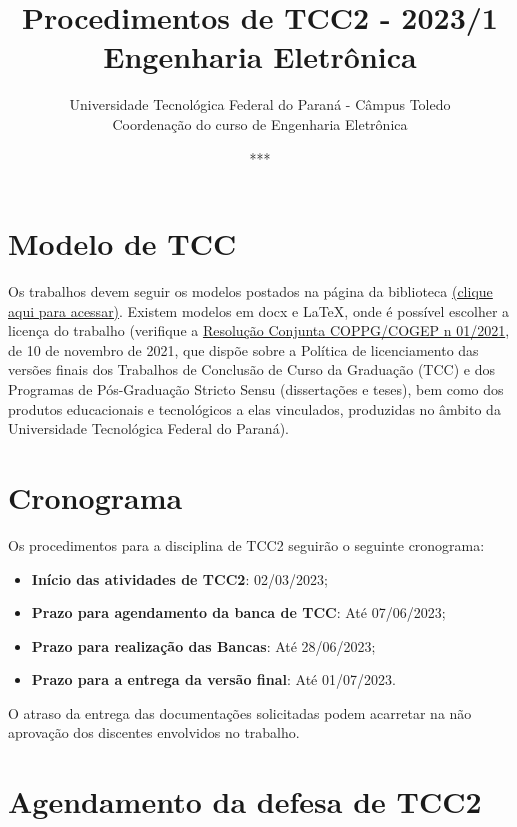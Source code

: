 \documentclass[a4paper, 12pt]{article}
\title{Procedimentos de TCC2 - 2023/1\\\textbf{Engenharia Eletrônica}}
\date{***}
\author{Universidade Tecnológica Federal do Paraná - Câmpus Toledo\\Coordenação do curso de Engenharia Eletrônica}
\newcommand{\startdate}{02/03/2023}		%
\newcommand{\agendadate}{07/06/2023}	%
\newcommand{\bancadate}{28/06/2023}		%
\newcommand{\finaldate}{01/07/2023}		%
\begin{document}
    \maketitle
    
    \section{Modelo de TCC}
    Os trabalhos devem seguir os modelos postados na página da biblioteca \href{http://portal.utfpr.edu.br/biblioteca/trabalhos-academicos}{(clique aqui para acessar)}. Existem modelos em docx e \LaTeX, onde é possível escolher a licença do trabalho (verifique a \href{https://sei.utfpr.edu.br/sei/publicacoes/controlador_publicacoes.php?acao=publicacao_visualizar&id_documento=2615190&id_orgao_publicacao=0}{Resolução Conjunta COPPG/COGEP n\textordmasculine{} 01/2021}, de 10 de novembro de 2021, que dispõe sobre a Política de licenciamento das versões finais dos Trabalhos de Conclusão de Curso da Graduação (TCC) e dos Programas de Pós-Graduação Stricto Sensu (dissertações e teses), bem como dos produtos educacionais e tecnológicos a elas vinculados, produzidas no âmbito da Universidade Tecnológica Federal do Paraná).
    
    \section{Cronograma}
    \label{sec:CRO}
    
    Os procedimentos para a disciplina de TCC2 seguirão o seguinte cronograma:
    \begin{itemize}
    	\item \textbf{Início das atividades de TCC2}: \startdate;
    	\item \textbf{Prazo para agendamento da banca de TCC}: Até \agendadate;
    	\item \textbf{Prazo para realização das Bancas}: Até \bancadate;
    	\item \textbf{Prazo para a entrega da versão final}: Até \finaldate.
    \end{itemize}

	O atraso da entrega das documentações solicitadas podem acarretar na não aprovação dos discentes envolvidos no trabalho.    
        
   \section{Agendamento da defesa de TCC2}
\end{document}
